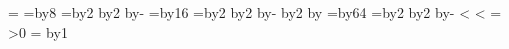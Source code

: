 {{          %
          \dtLFL=\relax
          \dtPEG=\dtLFL \divide\dtPEG by8
          \tmpd=\dtPEG \divide\tmpd by2 \multiply\tmpd by2
          \advance\dtPEG by-\tmpd
          \dtPGB=\dtLFL \divide\dtPGB by16
          \tmpd=\dtPGB \divide\tmpd by2 \multiply\tmpd by2
          \advance\dtPGB by-\tmpd
          \multiply\dtPGB by2 \advance\dtPEG by\dtPGB
          \tmpd=\dtLFL \divide\tmpd by64
          \dtPGB=\tmpd \divide\dtPGB by2 \multiply\dtPGB by2
          \advance\tmpd by-\dtPGB
          \ifnum{}
            \edef\dt@next{\noexpand\dtAddLineSound{\the\dtJ}}\dt@next
          \fi
          \edef\dt@next{\noexpand\dtAddLineSide{\the\dtJ}%
            {\ifnum\dtFRONT<\dtNSD \the\dtFRONT\else-1\fi}%
            {\ifnum\dtBACK<\dtNSD \the\dtBACK{}\fi}%
            {\the\dtPEG}}%
          \dt@next
          \dtLSP=\relax
          \ifnum\dtLSP>0
            \edef\dt@next{\noexpand\dtAddLineSpec{\the\dtJ}{\the\dtLSP}}%
            \dt@next
          \fi
          \dtLTG=\relax
          \ifnum{}\else
            \edef\dt@next{\noexpand\dtAddLineTag{\the\dtJ}{\the\dtLTG}}%
            \dt@next
          \fi
          \advance\dtJ by1\relax }%
        }
